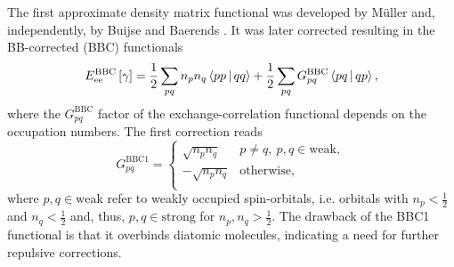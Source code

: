 The first approximate density matrix functional was developed by Müller
and, independently, by Buijse and Baerends .
It was later corrected resulting in the BB-corrected (BBC) functionals
\begin{equation}
    E_{\text{ee}}^{\text{BBC}}\left[ \fordm \right] =
    \frac{1}{2} \sum_{pq} n_p n_q \Braket{pp | qq} +
    \frac{1}{2} \sum_{pq} G_{pq}^{\text{BBC}} \Braket{pq | qp}
    ,
\end{equation}
where the $G_{pq}^{\text{BBC}}$ factor of the exchange-correlation functional
depends on the occupation numbers.
The first correction reads
\begin{equation}
    G_{pq}^{\text{BBC1}} = 
    \begin{cases}
        \sqrt{n_p n_q} & p \not= q,\ p,q \in \text{weak}, \\
        -\sqrt{n_p n_q} & \text{otherwise}, \\
    \end{cases}
\end{equation}
where $p,q \in \text{weak}$ refer to weakly occupied spin-orbitals, i.e. 
orbitals with $n_p < \frac{1}{2}$ and $n_q < \frac{1}{2}$ and, thus, 
$p,q \in \text{strong}$ for $n_p, n_q > \frac{1}{2}$.
The drawback of the BBC1 functional is that it overbinds diatomic molecules,
indicating a need for further repulsive corrections.

